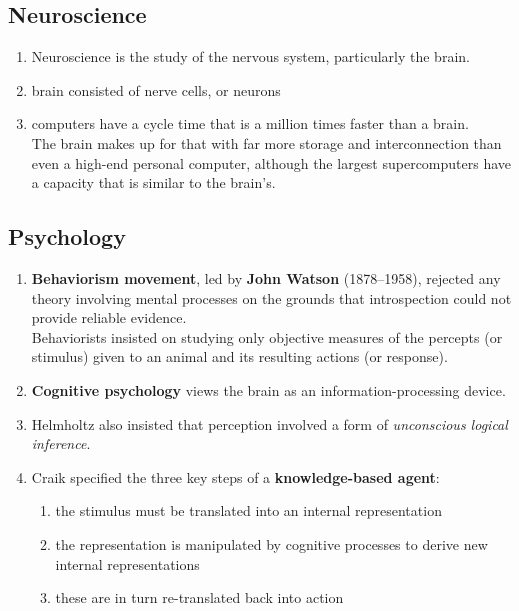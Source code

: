 \subsection{Neuroscience}
\begin{enumerate}
    \item Neuroscience is the study of the nervous system, particularly the brain.

    \item brain consisted of nerve cells, or neurons

    \item computers have a cycle time that is a million times faster than a brain.\\
    The brain makes up for that with far more storage and interconnection than even a high-end personal computer, although the largest supercomputers have a capacity that is similar to the brain’s.
\end{enumerate}

\subsection{Psychology}
\begin{enumerate}
    \item \textbf{Behaviorism movement}, led by \textbf{John Watson} (1878–1958), rejected any theory involving mental processes on the grounds that introspection could not provide reliable evidence. \\
    Behaviorists insisted on studying only objective measures of the percepts (or stimulus) given to an animal and its resulting actions (or response). 

    \item \textbf{Cognitive psychology} views the brain as an information-processing device.

    \item Helmholtz also insisted that perception involved a form of \textit{unconscious logical inference}.

    \item Craik specified the three key steps of a \textbf{knowledge-based agent}: 
    \begin{enumerate}
        \item the stimulus must be translated into an internal representation
        \item the representation is manipulated by cognitive processes to derive new internal representations
        \item these are in turn re-translated back into action
    \end{enumerate}

    
\end{enumerate}

